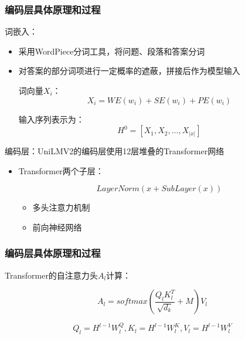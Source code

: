 \documentclass{beamer}
\begin{document}
\begin{frame}
    \frametitle{编码层具体原理和过程}

    词嵌入：

    \begin{itemize}
        \item 采用WordPiece分词工具，将问题、段落和答案分词
        \item 对答案的部分词项进行一定概率的遮蔽，拼接后作为模型输入
        
        词向量$X_i$：
        \begin{equation}
            X_i = WE(w_i) + SE(w_i) + PE(w_i)
        \end{equation}

        输入序列表示为：
        \begin{equation}
            H^0 = [X_1, X_2, ..., X_{\lvert x \rvert}]
        \end{equation}
    \end{itemize}

    编码层：UniLMV2的编码层使用12层堆叠的Transformer网络
    
    \begin{itemize}
        \item Transformer两个子层：
        
        \begin{equation}
            LayerNorm(x + SubLayer(x))
        \end{equation}

        \begin{itemize}
            \item 多头注意力机制
            \item 前向神经网络
        \end{itemize}
    \end{itemize}

\end{frame}

\begin{frame}
    \frametitle{编码层具体原理和过程}

    Transformer的自注意力头$A_l$计算：

    \begin{equation}
        A_l = softmax(\frac{Q_l K_l^T}{\sqrt{d_k}} + M) V_l
    \end{equation}

    \begin{equation}
        Q_l = H^{l - 1} W_l^Q, K_l = H^{l - 1} W_l^K, V_l = H^{l - 1} W_l^V
    \end{equation}
\end{frame}
\end{document}
